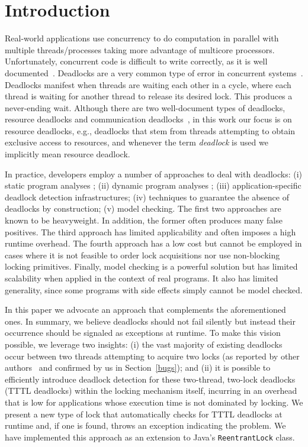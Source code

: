 \section{Introduction}

Real-world applications use concurrency to do computation in parallel with multiple threads/processes taking more advantage of multicore processors. Unfortunately, concurrent code is difficult to write correctly, as it is well documented~\cite{lu}. Deadlocks are a very common type of error in concurrent systems~\cite{lu}.
Deadlocks manifest when threads are waiting each other in a cycle, where each thread is waiting for another thread to release its desired lock. This produces a never-ending wait.
Although there are two well-document types of deadlocks, resource deadlocks and communication deadlocks~\cite{singhal}\cite{knapp}, in this work our focus is on resource deadlocks, e.g., deadlocks that stem from threads attempting to obtain exclusive access to resources, and whenever the term \emph{deadlock} is used we implicitly mean resource deadlock.

In practice, developers employ a number of approaches to deal with deadlocks: (i) static program analyses \cite{marino}\cite{dawson}\cite{vivek}\cite{williams}; (ii) dynamic program analyses \cite{mcsdk}\cite{magicfuzzer}; (iii) application-specific deadlock detection infrastructures; (iv) techniques to guarantee the absence of deadlocks by construction; (v) model checking. The first two approaches are known to be heavyweight. In addition, the former often produces many false positives. The third approach has limited applicability and often imposes a high runtime overhead. The fourth approach has a low cost but cannot be employed in cases where it is not feasible to order lock acquisitions nor use non-blocking locking primitives. Finally, model checking is a powerful solution but has limited scalability when applied in the context of real programs. It also has limited generality, since some programs with side effects simply cannot be model checked.  

In this paper we advocate an approach that complements the aforementioned ones. In summary, we believe deadlocks should not fail silently but instead their occurrence  should be signaled as exceptions at runtime. To make this vision possible, we leverage two insights: (i) the vast majority of existing deadlocks occur between two threads attempting to acquire two locks (as reported by other authors~\cite{lu} and confirmed by us in Section~\ref{bugs}); and (ii) it is possible to efficiently introduce deadlock detection for these two-thread, two-lock deadlocks (TTTL deadlocks) within the locking mechanism itself, incurring in an overhead that is low for applications whose execution time is not dominated by locking. We present a new type of lock that automatically checks for TTTL deadlocks at runtime and, if one is found, throws an exception indicating the problem. We have implemented this approach as an extension to Java's {\tt ReentrantLock} class. 

